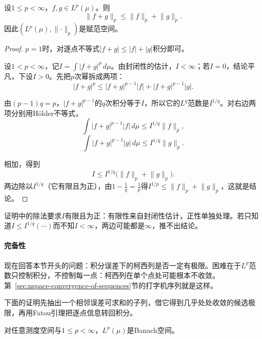 \begin{theorem}[Minkowski不等式]
\label{thm:nspace-minkowski}
设$1\leq p<\infty$，$f,g\in L^p(\mu)$。则
\begin{equation}
 \lVert f+g\rVert_p\leq\lVert f\rVert_p+\lVert g\rVert_p.
 \label{eq:nspace-minkowski}
\end{equation}
因此$(L^p(\mu),\lVert\cdot\rVert_p)$是赋范空间。
\end{theorem}

\begin{proof}
$p=1$时，对逐点不等式$\lvert f+g\rvert\leq\lvert f\rvert+\lvert g\rvert$积分即可。

设$1<p<\infty$，记$I=\int\lvert f+g\rvert^p\,d\mu$。由封闭性的估计，$I<\infty$；若$I=0$，结论平凡，下设$I>0$。先把$p$次幂拆成两项：
\[
 \lvert f+g\rvert^p\leq\lvert f+g\rvert^{p-1}\lvert f\rvert+\lvert f+g\rvert^{p-1}\lvert g\rvert.
\]

由$(p-1)q=p$，$\lvert f+g\rvert^{p-1}$的$q$次积分等于$I$，所以它的$L^q$范数是$I^{1/q}$。对右边两项分别用Hölder不等式，
\[
 \int\lvert f+g\rvert^{p-1}\lvert f\rvert\,d\mu\leq I^{1/q}\lVert f\rVert_p,
\]
\[
 \int\lvert f+g\rvert^{p-1}\lvert g\rvert\,d\mu\leq I^{1/q}\lVert g\rVert_p.
\]

相加，得到
\[
 I\leq I^{1/q}\bigl(\lVert f\rVert_p+\lVert g\rVert_p\bigr).
\]
两边除以$I^{1/q}$（它有限且为正），由$1-\tfrac1q=\tfrac1p$得$I^{1/p}\leq\lVert f\rVert_p+\lVert g\rVert_p$，这就是结论。
\end{proof}

证明中的除法要求$I$有限且为正：有限性来自封闭性估计，正性单独处理。若只知道$I\leq I^{1/q}(\cdots)$而不知$I<\infty$，两边可能都是$\infty$，推不出结论。

\paragraph{完备性}
现在回答本节开头的问题：积分误差下的柯西列是否一定有极限。困难在于$L^p$范数只控制积分，不控制每一点：柯西列在单个点处可能根本不收敛。第~\ref{sec:nspace-convergence-of-sequences}节的打字机序列就是这样。

下面的证明先抽出一个相邻误差可求和的子列，借它得到几乎处处收敛的候选极限，再用Fatou引理把逐点信息转回积分。

\begin{theorem}[$L^p$的完备性]
\label{thm:nspace-lp-complete}
对任意测度空间与$1\leq p<\infty$，$L^p(\mu)$是Banach空间。
\end{theorem}

